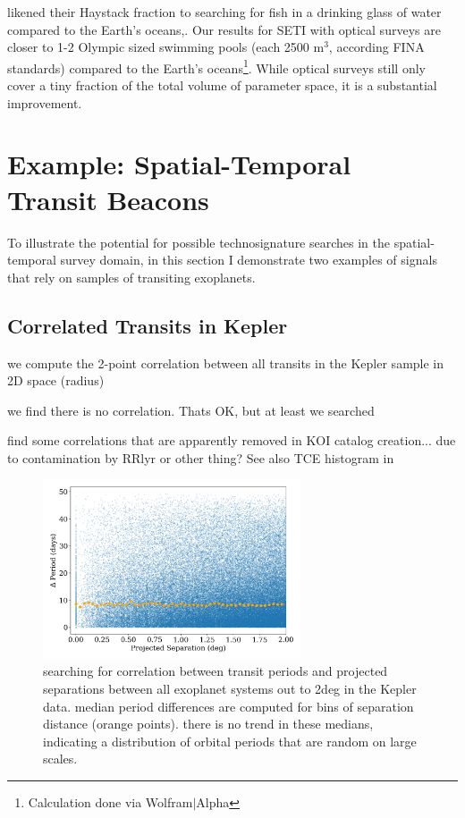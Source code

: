 \documentclass[twocolumn]{aastex62}
\begin{document}
\citet{wright2018c} likened their Haystack fraction to searching for fish in a drinking glass of water compared to the Earth's oceans,. Our results for SETI with optical surveys are closer to 1-2 Olympic sized swimming pools (each 2500 m$^3$, according FINA standards) compared to the Earth's oceans\footnote{Calculation done via Wolfram$|$Alpha}. While optical surveys still only cover a tiny fraction of the total volume of parameter space, it is a substantial improvement.




\section{Example: Spatial-Temporal\\ Transit Beacons}
\label{sec:transit}

To illustrate the potential for possible technosignature searches in the spatial-temporal survey domain, in this section I demonstrate two examples of signals that rely on samples of transiting exoplanets.




\subsection{Correlated Transits in Kepler}
we compute the 2-point correlation between all transits in the Kepler sample in 2D space (radius)

we find there is no correlation. Thats OK, but at least we searched

\citet{coughlin2014} find some correlations that are apparently removed in KOI catalog creation... due to contamination by RRlyr or other thing?
See also TCE histogram in \citet{twicken2016}



\begin{figure}[!t]
\centering
\includegraphics[width=3in]{../figures/delta_per.png}
\caption{searching for correlation between transit periods and projected separations between all exoplanet systems out to 2deg in the Kepler data. 
median period differences are computed for bins of separation distance (orange points).
there is no trend in these medians, indicating a distribution of orbital periods that are random on large scales.}
\label{fig:2dcor}
\end{figure}
\end{document}
